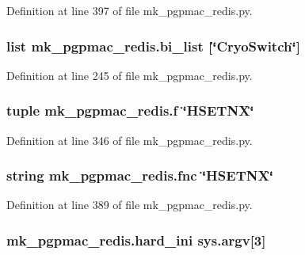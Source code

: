 Definition at line 397 of file mk\-\_\-pgpmac\-\_\-redis.\-py.

\hypertarget{namespacemk__pgpmac__redis_a961bfabfbdcbf5b749f6e6ecdc733619}{
\subsubsection[{bi\-\_\-list}]{\setlength{\rightskip}{0pt plus 5cm}list mk\-\_\-pgpmac\-\_\-redis.\-bi\-\_\-list \mbox{[}\char`\"{}Cryo\-Switch\char`\"{}\mbox{]}}}\label{namespacemk__pgpmac__redis_a961bfabfbdcbf5b749f6e6ecdc733619}


Definition at line 245 of file mk\-\_\-pgpmac\-\_\-redis.\-py.

\hypertarget{namespacemk__pgpmac__redis_a057fe7457503e0de97edcf855591ed58}{
\subsubsection[{f}]{\setlength{\rightskip}{0pt plus 5cm}tuple mk\-\_\-pgpmac\-\_\-redis.\-f \char`\"{}H\-S\-E\-T\-N\-X\char`\"{}}}\label{namespacemk__pgpmac__redis_a057fe7457503e0de97edcf855591ed58}


Definition at line 346 of file mk\-\_\-pgpmac\-\_\-redis.\-py.

\hypertarget{namespacemk__pgpmac__redis_a654b54ba0758b8b84516938260851129}{
\subsubsection[{fnc}]{\setlength{\rightskip}{0pt plus 5cm}string mk\-\_\-pgpmac\-\_\-redis.\-fnc \char`\"{}H\-S\-E\-T\-N\-X\char`\"{}}}\label{namespacemk__pgpmac__redis_a654b54ba0758b8b84516938260851129}


Definition at line 389 of file mk\-\_\-pgpmac\-\_\-redis.\-py.

\hypertarget{namespacemk__pgpmac__redis_a5864d9c27cbe61534756880cbfebe4f1}{
\subsubsection[{hard\-\_\-ini}]{\setlength{\rightskip}{0pt plus 5cm}mk\-\_\-pgpmac\-\_\-redis.\-hard\-\_\-ini sys.\-argv\mbox{[}3\mbox{]}}}\label{namespacemk__pgpmac__redis_a5864d9c27cbe61534756880cbfebe4f1}


